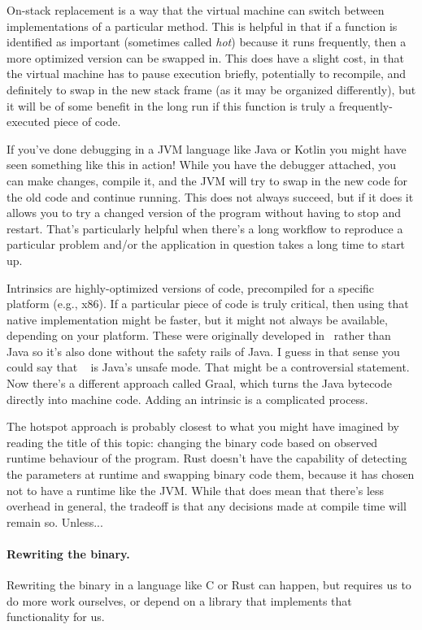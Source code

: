 On-stack replacement is a way that the virtual machine can switch between implementations of a particular method. This is helpful in that if a function is identified as important (sometimes called \textit{hot}) because it runs frequently, then a more optimized version can be swapped in. This does have a slight cost, in that the virtual machine has to pause execution briefly, potentially to recompile, and definitely to swap in the new stack frame (as it may be organized differently), but it will be of some benefit in the long run if this function is truly a frequently-executed piece of code.

If you've done debugging in a JVM language like Java or Kotlin you might have seen something like this in action! While you have the debugger attached, you can make changes, compile it, and the JVM will try to swap in the new code for the old code and continue running. This does not always succeed, but if it does it allows you to try a changed version of the program without having to stop and restart. That's particularly helpful when there's a long workflow to reproduce a particular problem and/or the application in question takes a long time to start up.

Intrinsics are highly-optimized versions of code, precompiled for a specific platform (e.g., x86). If a particular piece of code is truly critical, then using that native implementation might be faster, but it might not always be available, depending on your platform. These were originally developed in \CPP~rather than Java so it's also done without the safety rails of Java. I guess in that sense you could say that \CPP~ is Java's unsafe mode. That might be a controversial statement. Now there's a different approach called Graal, which turns the Java bytecode directly into machine code. Adding an intrinsic is a complicated process.

The hotspot approach is probably closest to what you might have imagined by reading the title of this topic: changing the binary code based on observed runtime behaviour of the program. Rust doesn't have the capability of detecting the parameters at runtime and swapping binary code them, because it has chosen not to have a runtime like the JVM. While that does mean that there's less overhead in general, the tradeoff is that any decisions made at compile time will remain so. Unless...

\paragraph{Rewriting the binary.}
Rewriting the binary in a language like C or Rust can happen, but requires us to do more work ourselves, or depend on a library that implements that functionality for us.

